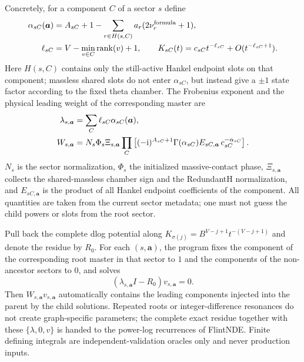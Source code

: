 \documentclass[11pt,a4paper]{article}
\newcommand{\ii}{\mathrm i}
\begin{document}
Concretely, for a component $C$ of a sector $s$ define
\begin{align}
 \alpha_{sC}(\bm a)&=A_{sC}+1-
 \sum_{r\in H(s,C)}a_r(2\nu_r^{\rm formula}+1),
 \notag\\
 \ell_{sC}&=V-\min_{v\in C}\operatorname{rank}(v)+1,
 \qquad
 K_{sC}(t)=c_{sC}t^{-\ell_{sC}}+O(t^{-\ell_{sC}+1}).
 \label{eq:generic-sector-boundary-component}
\end{align}
Here $H(s,C)$ contains only the still-active Hankel endpoint slots on that component; massless shared slots do not enter $\alpha_{sC}$, but instead give a $\pm1$ state factor according to the fixed theta chamber. The Frobenius exponent and the physical leading weight of the corresponding master are
\begin{align}
 \lambda_{s,\bm a}&=\sum_C\ell_{sC}\alpha_{sC}(\bm a),
 \notag\\
 W_{s,\bm a}&=N_s\Phi_s\Xi_{s,\bm a}
 \prod_C\left[
 (-\ii)^{A_{sC}+1}\Gamma(\alpha_{sC})
 E_{sC,\bm a}\,c_{sC}^{-\alpha_{sC}}
 \right].
 \label{eq:generic-sector-boundary-weight}
\end{align}
$N_s$ is the sector normalization, $\Phi_s$ the initialized massive-contact phase, $\Xi_{s,\bm a}$ collects the shared-massless chamber sign and the RedundantH normalization, and $E_{sC,\bm a}$ is the product of all Hankel endpoint coefficients of the component. All quantities are taken from the current sector metadata; one must not guess the child powers or slots from the root sector.

Pull back the complete dlog potential along $K_{\sigma(j)}=B^{V-j+1}t^{-(V-j+1)}$ and denote the residue by $R_0$. For each $(s,\bm a)$, the program fixes the component of the corresponding root master in that sector to $1$ and the components of the non-ancestor sectors to $0$, and solves
\begin{equation}
 (\lambda_{s,\bm a}I-R_0)v_{s,\bm a}=0.
 \label{eq:generic-sector-indicial-vector}
\end{equation}
Then $W_{s,\bm a}v_{s,\bm a}$ automatically contains the leading components injected into the parent by the child solutions. Repeated roots or integer-difference resonances do not create graph-specific parameters; the complete exact residue together with these $\{\lambda,0,v\}$ is handed to the power-log recurrences of FlintNDE. Finite defining integrals are independent-validation oracles only and never production inputs.
\end{document}
